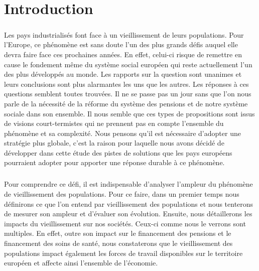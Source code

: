 \chapter*{Introduction}
\paragraph{}Les pays industrialisés font face à un vieillissement de leurs populations. Pour l’Europe, ce phénomène est sans doute l’un des plus grands défis auquel elle devra faire face ces prochaines années. En effet, celui-ci risque de remettre en cause le fondement même du système social européen qui reste actuellement l’un des plus développés au monde. Les rapports sur la question sont unanimes et leurs conclusions sont plus alarmantes les uns que les autres. Les réponses à ces questions semblent toutes trouvées. Il ne se passe pas un jour sans que l’on nous parle de la nécessité de la réforme du système des pensions et de notre système sociale dans son ensemble. Il nous semble que ces types de propositions sont issus de visions court-termistes qui ne prennent pas en compte l’ensemble du phénomène et sa complexité. Nous pensons qu’il est nécessaire d’adopter une stratégie plus globale, c’est la raison pour laquelle nous avons décidé de développer dans cette étude des pistes de solutions que les pays européens pourraient adopter pour apporter une réponse durable à ce phénomène.
 
\paragraph{}Pour comprendre ce défi, il est indispensable d’analyser l’ampleur du phénomène de vieillissement des populations.  Pour ce faire, dans un premier temps nous définirons ce que l’on entend par vieillissement des populations et nous tenterons de mesurer son ampleur et d’évaluer son évolution. Ensuite, nous détaillerons les impacts du vieillissement sur nos sociétés. Ceux-ci comme nous le verrons sont multiples. En effet, outre son impact sur le financement des pensions et le financement des soins de santé, nous constaterons que  le vieillissement des populations impact également les forces de travail disponibles sur le territoire européen et affecte ainsi l’ensemble de l’économie.
 
